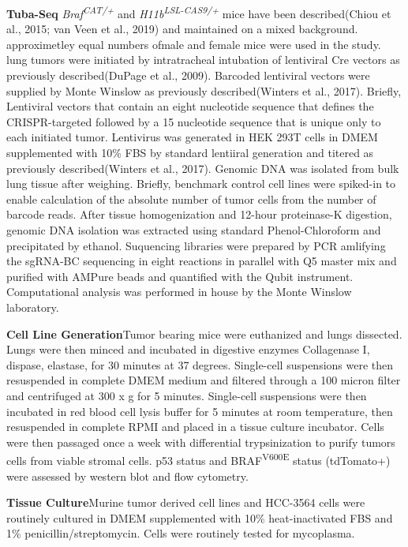 \textbf{Tuba-Seq} \emph{Braf\textsuperscript{CAT/+}} and \emph{H11b\textsuperscript{LSL-CAS9/+}} mice have been described(Chiou et al., 2015; van Veen et al., 2019) and maintained on a mixed background. approximetley equal numbers ofmale and female mice were used in the study. lung tumors were initiated by intratracheal intubation of lentiviral Cre vectors as previously described(DuPage et al., 2009). Barcoded lentiviral vectors were supplied by Monte Winslow as previously described(Winters et al., 2017). Briefly, Lentiviral vectors that contain an eight nucleotide sequence that defines the CRISPR-targeted followed by a 15 nucleotide sequence that is unique only to each initiated tumor. Lentivirus was generated in HEK 293T cells in DMEM supplemented with 10\% FBS by standard lentiiral generation and titered as previously described(Winters et al., 2017). Genomic DNA was isolated from bulk lung tissue after weighing. Briefly, benchmark control cell lines were spiked-in to enable calculation of the absolute number of tumor cells from the number of barcode reads. After tissue homogenization and 12-hour proteinase-K digestion, genomic DNA isolation was extracted using standard Phenol-Chloroform and precipitated by ethanol. Suquencing libraries were prepared by PCR amlifying the sgRNA-BC sequencing in eight reactions in parallel with Q5 master mix and purified with AMPure beads and quantified with the Qubit instrument. Computational analysis was performed in house by the Monte Winslow laboratory.

\textbf{Cell Line Generation}Tumor bearing mice were euthanized and lungs dissected. Lungs were then minced and incubated in digestive enzymes Collagenase I, dispase, elastase, for 30 minutes at 37 degrees. Single-cell suspensions were then resuspended in complete DMEM medium and filtered through a 100 micron filter and centrifuged at 300 x g for 5 minutes. Single-cell suspensions were then incubated in red blood cell lysis buffer for 5 minutes at room temperature, then resuspended in complete RPMI and placed in a tissue culture incubator. Cells were then passaged once a week with differential trypsinization to purify tumors cells from viable stromal cells. p53 status and BRAF\textsuperscript{V600E} status (tdTomato+) were assessed by western blot and flow cytometry.

\textbf{Tissue Culture}Murine tumor derived cell lines and HCC-3564 cells were routinely cultured in DMEM supplemented with 10\% heat-inactivated FBS and 1\% penicillin/streptomycin. Cells were routinely tested for mycoplasma.

